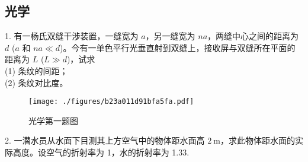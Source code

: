 \subsection{光学}
1. 有一杨氏双缝干涉装置，一缝宽为 $a$，另一缝宽为 $na$，两缝中心之间的距离为 $d$ ($a$ 和 $na \ll d$)。今有一单色平行光垂直射到双缝上，接收屏与双缝所在平面的距离为 $L$ ($L \gg d$)，试求\\
(1) 条纹的间距；\\
(2) 条纹对比度。
\begin{figure}[ht]
\centering
\texttt{[image: ./figures/b23a011d91bfa5fa.pdf]}
\caption{光学第一题图} \label{fig_NJU16_3}
\end{figure}
2. 一潜水员从水面下目测其上方空气中的物体距水面高 $2 \mathrm{~m}$，求此物体距水面的实际高度。设空气的折射率为 1，水的折射率为 1.33.
